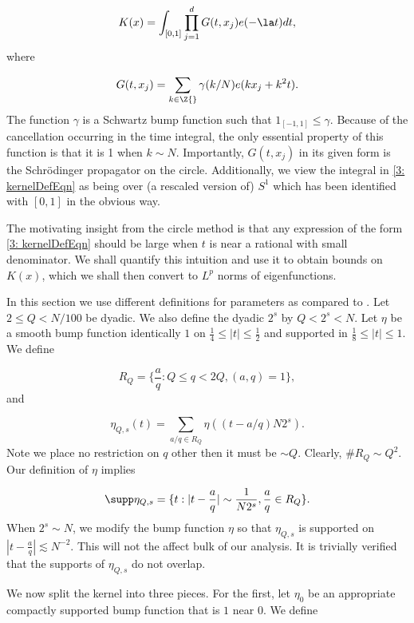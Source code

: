 \documentclass[11pt]{amsart}
\begin{document}
\begin{equation}\label{3: kernelDefEqn}
    K(x) = \int_{[0,1]}\prod_{j=1}^dG(t,x_j) e(-\la t)dt,
\end{equation}
where

\begin{equation}\label{3: SchroPropG(t,x)DefEqn}
    G(t,x_j) = \sum_{k\in\Z{}}\gamma(k/N)e(kx_j+k^2t).
\end{equation}
The function $\gamma$ is a Schwartz bump function such that $ 1_{[-1,1]}\leq \gamma$. Because of the cancellation occurring in the time integral, the only essential property of this function is that it is 1 when $k\sim N$. Importantly, $G(t,x_j)$ in its given form is the Schr\"odinger propagator on the circle. Additionally, we view the integral in \eqref{3: kernelDefEqn} as being over (a rescaled version of) $S^1$ which has been identified with $[0,1]$ in the obvious way.

The motivating insight from the circle method is that any expression of the form \eqref{3: kernelDefEqn} should be large when $t$ is near a rational with small denominator. We shall quantify this intuition and use it to obtain bounds on $K(x)$, which we shall then convert to $L^p$ norms of eigenfunctions.

In this section we use different definitions for parameters as compared to . Let $2\leq Q <N/100$ be dyadic. We also define the dyadic $2^s$ by $Q<2^s <N$. Let $\eta$ be a smooth bump function identically $1$ on $\frac{1}{4}\leq |t|\leq \frac{1}{2}$ and supported in $\frac{1}{8}\leq |t|\leq 1$. We define

$$R_Q = \{\frac{a}{q}: Q\leq q< 2Q, (a,q)=1\},$$
and

\begin{equation}\label{3: etaQDef}
    \eta_{Q,s}(t) = \sum_{a/q\in R_{Q}}\eta((t-a/q)N2^s).
\end{equation}
Note we place no restriction on $q$ other then it must be $\sim Q$. Clearly, $\#R_Q\sim Q^2$. Our definition of $\eta$ implies

$$\supp \eta_{Q,s} = \{t:|t-\frac{a}{q}|\sim \frac{1}{N2^s}, \frac{a}{q}\in R_Q\}.$$
When $2^s\sim N$, we modify the bump function $\eta$ so that $\eta_{Q,s}$ is supported on $|t-\frac{a}{q}|\lesssim N^{-2}$. This will not the affect bulk of our analysis. It is trivially verified that the supports of $\eta_{Q,s}$ do not overlap. 

We now split the kernel into three pieces. For the first, let $\eta_0$ be an appropriate compactly supported bump function that is $1$ near $0$. We define
\end{document}
